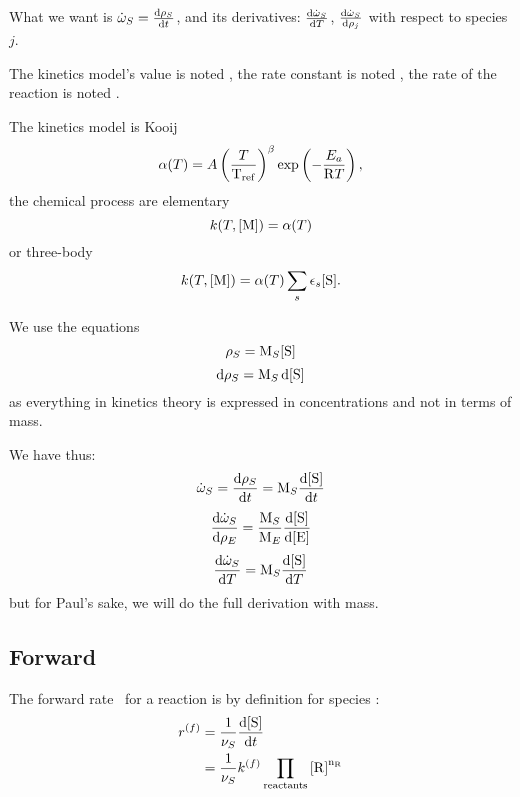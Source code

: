 What we want is 
$\mdot[S] = \doverdt{\mass[S]}$, and its derivatives:
$\doverdT{\mdot[S]}$, $\doverdm[j]{\mdot[S]}$ with respect to species $j$.

The kinetics model's value is noted \kinMod, the rate constant is noted \rateCons, the
rate of the reaction is noted \rate.

The kinetics model is Kooij 
\begin{equation}
\alpha(T) = {A} \left(\frac{T}{\mathrm{T_{ref}}}\right)^{\beta}\exp\left(-\frac{E_a}{\mathrm{R} T}\right),
\label{KooijEq}
\end{equation}
the chemical process are elementary 
\begin{equation}
\rateCons = \kinMod
\label{ChemProEl}
\end{equation} 
or three-body 
\begin{equation}
\rateCons = \kinMod \threeBody.
\label{ChemProTB}
\end{equation}

We use the equations
\begin{equation}
\mass[S] = \Mm[S] \conc[S]
\end{equation}
\begin{equation}
\dd\mass[S] = \Mm[S]\,\dd\conc[S]
\end{equation}
as everything in kinetics theory is expressed in concentrations and 
not in terms of mass.

We have thus:
\begin{equation}
\mdot[S] = \doverdt{\mass[S]} = \Mm[S] \doverdt{\conc[S]}
\end{equation}
\begin{equation}
\doverdm[E]{\mdot[S]} = \frac{\Mm[S]}{\Mm[E]}\doverdc[E]{\conc[S]}
\end{equation}
\begin{equation}
\doverdT{\mdot[S]} = \Mm[S]\doverdT{\conc[S]}
\end{equation}
but for Paul's sake, we will do the full derivation with mass.

\subsection{Forward}

The forward rate \fwdrate\ for a reaction is by definition for species :
\begin{equation}
\begin{split}
\fwdrate &= \frac{1}{\scoef[S]}\frac{\dd\conc[S]}{\dd t}\\
         &= \frac{1}{\scoef[S]} \fwdratecons \prodReac
\end{split}
\label{ratefDef}
\end{equation}

